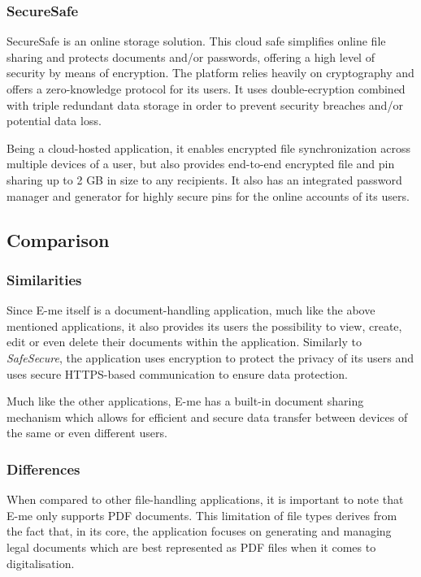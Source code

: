 \subsubsection{SecureSafe}

SecureSafe is an online storage solution.
This cloud safe simplifies online file sharing and protects documents and/or passwords, offering a high level of security by means of encryption.
The platform relies heavily on cryptography and offers a zero-knowledge protocol for its users.
It uses double-ecryption combined with triple redundant data storage in order to prevent security breaches and/or potential data loss.

Being a cloud-hosted application, it enables encrypted file synchronization across multiple devices of a user, but also provides
end-to-end encrypted file and pin sharing up to 2 GB in size to any recipients.
It also has an integrated password manager and generator for highly secure pins for the online accounts of its users.

\subsection{Comparison}

\subsubsection{Similarities}

Since E-me itself is a document-handling application, much like the above mentioned applications, it also provides its users the possibility to view,
create, edit or even delete their documents within the application.
Similarly to \emph{SafeSecure}, the application uses encryption to protect the privacy of its users and uses secure HTTPS-based communication
to ensure data protection.

Much like the other applications, E-me has a built-in document sharing mechanism which allows for efficient and secure data transfer between devices of
 the same or even different users. 


\subsubsection{Differences}

When compared to other file-handling applications, it is important to note that E-me only supports PDF documents.
This limitation of file types derives from the fact that, in its core, the application focuses on generating and managing legal documents which
are best represented as PDF files when it comes to digitalisation.

